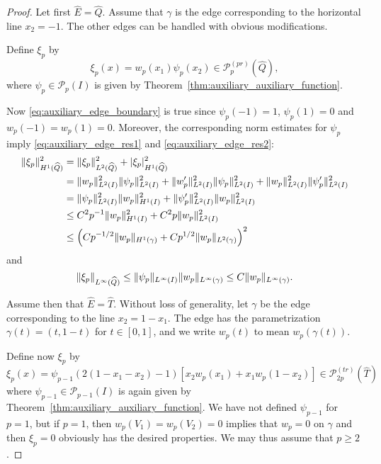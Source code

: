 \documentclass[english, 12pt, a4paper, sci, utf8, a-2b, online]{aaltothesis}
\theoremstyle{definition}
\theoremstyle{plain}
\DeclarePairedDelimiter\abs{\lvert}{\rvert}
\DeclarePairedDelimiter\norm{\lVert}{\rVert}
\numberwithin{equation}{section}
\begin{document}
\begin{proof}
    Let first $\widehat{E} = \widehat{Q}$.
    Assume that $\gamma$ is the edge corresponding to the
    horizontal line $x_2 = -1$. The other edges can be handled
    with obvious modifications.

    Define $\xi_p$ by
    \begin{equation*}
        \xi_p(x) = w_p(x_1) \psi_p(x_2) \in \mathcal{P}_p^{(pr)}(\widehat{Q}),
    \end{equation*}
    where $\psi_p \in \mathcal{P}_p(I)$ is given by
    Theorem~\ref{thm:auxiliary_auxiliary_function}.
    
    Now \eqref{eq:auxiliary_edge_boundary} is true
    since $\psi_p(-1) = 1$, $\psi_p(1) = 0$ and $w_p(-1) = w_p(1) = 0$.
    Moreover, the corresponding norm estimates for $\psi_p$ imply
    \eqref{eq:auxiliary_edge_res1} and \eqref{eq:auxiliary_edge_res2}:
    \begin{align*}
        \norm{\xi_p}_{H^1(\widehat{Q})}^2
        &= \norm{\xi_p}_{L^2(\widehat{Q})}^2 + \abs{\xi_p}_{H^1(\widehat{Q})}^2 \\
        &= \norm{w_p}_{L^2(I)}^2 \norm{\psi_p}_{L^2(I)}^2
            + \norm{w_p'}_{L^2(I)}^2 \norm{\psi_p}_{L^2(I)}^2
            + \norm{w_p}_{L^2(I)}^2 \norm{\psi_p'}_{L^2(I)}^2 \\
        &= \norm{\psi_p}_{L^2(I)}^2 \norm{w_p}_{H^1(I)}^2
            + \norm{\psi_p'}_{L^2(I)}^2 \norm{w_p}_{L^2(I)}^2 \\
        &\leq C^2 p^{-1} \norm{w_p}_{H^1(I)}^2
            + C^2 p \norm{w_p}_{L^2(I)}^2 \\
        &\leq \left(
            C p^{-1/2} \norm{w_p}_{H^1(\gamma)} + C p^{1/2} \norm{w_p}_{L^2(\gamma)}
        \right)^2
    \end{align*}
    and
    \begin{equation*}
        \norm{\xi_p}_{L^{\infty}(\widehat{Q})}
        \leq \norm{\psi_p}_{L^{\infty}(I)} \norm{w_p}_{L^{\infty}(\gamma)}
        \leq C \norm{w_p}_{L^{\infty}(\gamma)}.
    \end{equation*}

    Assume then that $\widehat{E} = \widehat{T}$.
    Without loss of generality, let $\gamma$ be the edge corresponding
    to the line $x_2=1-x_1$. The edge has the parametrization
    $\gamma(t) = (t,1-t)$ for $t \in [0,1]$, and we write
    $w_p(t)$ to mean $w_p(\gamma(t))$.
    
    Define now $\xi_p$ by
    \begin{equation*}
        \xi_p(x) = \psi_{p-1}(2(1-x_1-x_2)-1) [ x_2 w_p(x_1) + x_1 w_p(1-x_2) ]
        \in \mathcal{P}_{2p}^{(tr)}(\widehat{T})
    \end{equation*}
    where $\psi_{p-1} \in \mathcal{P}_{p-1}(I)$ is again given by
    Theorem~\ref{thm:auxiliary_auxiliary_function}.
    We have not defined $\psi_{p-1}$ for $p=1$, but if $p=1$,
    then $w_p(V_1) = w_p(V_2) = 0$ implies that $w_p = 0$ on $\gamma$
    and then $\xi_p = 0$ obviously has the desired properties.
    We may thus assume that $p \geq 2$.


\end{proof}
\end{document}
